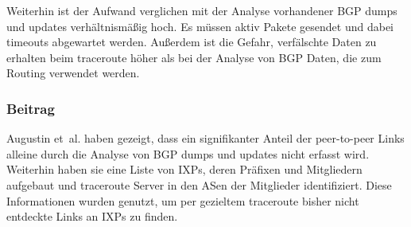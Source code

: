 Weiterhin ist der Aufwand verglichen mit der Analyse vorhandener BGP dumps und updates verhältnismäßig hoch.
Es müssen aktiv Pakete gesendet und dabei timeouts abgewartet werden.
Außerdem ist die Gefahr, verfälschte Daten zu erhalten beim traceroute höher als bei der Analyse von BGP Daten, die zum Routing verwendet werden.

\subsubsection{Beitrag}
Augustin et~al. haben gezeigt, dass ein signifikanter Anteil der peer-to-peer Links alleine durch die Analyse von BGP dumps und updates nicht erfasst wird.
Weiterhin haben sie eine Liste von IXPs, deren Präfixen und Mitgliedern aufgebaut und traceroute Server in den ASen der Mitglieder identifiziert.
Diese Informationen wurden genutzt, um per gezieltem traceroute bisher nicht entdeckte Links an IXPs zu finden.

